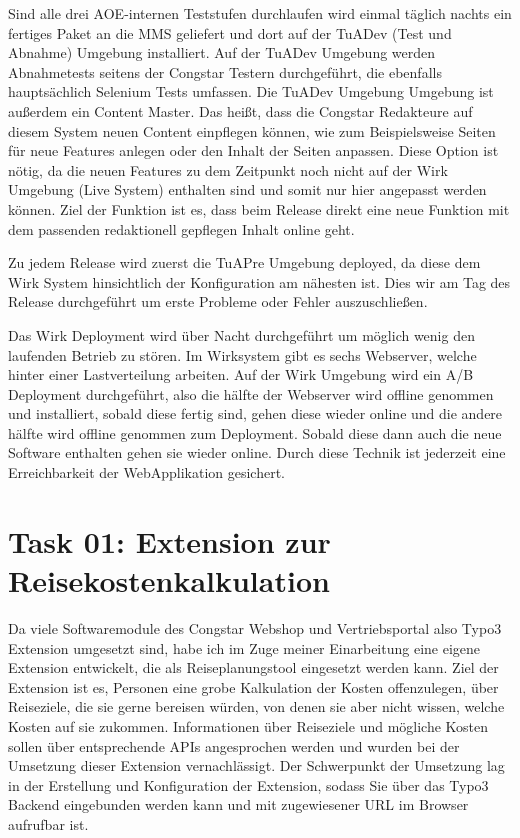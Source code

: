 \documentclass[11pt,a4paper]{article} %
\begin{document}
Sind alle drei AOE-internen Teststufen durchlaufen wird einmal täglich nachts ein fertiges Paket an die MMS geliefert und dort auf der TuADev (Test und Abnahme) Umgebung installiert. Auf der TuADev Umgebung werden Abnahmetests seitens der Congstar Testern durchgeführt, die ebenfalls hauptsächlich Selenium Tests umfassen. Die TuADev Umgebung Umgebung ist außerdem ein Content Master. Das heißt, dass die Congstar Redakteure auf diesem System neuen Content einpflegen können, wie zum Beispielsweise Seiten für neue Features anlegen oder den Inhalt der Seiten anpassen. Diese Option ist nötig, da die neuen Features zu dem Zeitpunkt noch nicht auf der Wirk Umgebung (Live System) enthalten sind und somit nur hier angepasst werden können. Ziel der Funktion ist es, dass beim Release direkt eine neue Funktion mit dem passenden redaktionell gepflegen Inhalt online geht.

Zu jedem Release wird zuerst die TuAPre Umgebung deployed, da diese dem Wirk System hinsichtlich der Konfiguration am nähesten ist.
Dies wir am Tag des Release durchgeführt um erste Probleme oder Fehler auszuschließen.

Das Wirk Deployment wird über Nacht durchgeführt um möglich wenig den laufenden Betrieb zu stören. Im Wirksystem gibt es sechs Webserver, welche hinter einer Lastverteilung arbeiten. Auf der Wirk Umgebung wird ein A/B Deployment durchgeführt, also die hälfte der Webserver wird offline genommen und installiert, sobald diese fertig sind, gehen diese wieder online und die andere hälfte wird offline genommen zum Deployment. Sobald diese dann auch die neue Software enthalten gehen sie wieder online.
Durch diese Technik ist jederzeit eine Erreichbarkeit der WebApplikation gesichert.




\section{Task 01: Extension zur Reisekostenkalkulation} \label{sec:pipeline}

Da viele Softwaremodule des Congstar Webshop und Vertriebsportal also Typo3 Extension umgesetzt sind, habe ich im Zuge 
meiner Einarbeitung eine eigene Extension entwickelt, die als Reiseplanungstool eingesetzt werden kann.
Ziel der Extension ist es, Personen eine grobe Kalkulation der Kosten offenzulegen, über Reiseziele, 
die sie gerne bereisen würden, von denen sie aber nicht wissen, welche Kosten auf sie zukommen. 
Informationen über Reiseziele und mögliche Kosten sollen über entsprechende APIs angesprochen werden und wurden bei der Umsetzung dieser Extension vernachlässigt.
Der Schwerpunkt der Umsetzung lag in der Erstellung und Konfiguration der Extension, sodass Sie über das
Typo3 Backend eingebunden werden kann und mit zugewiesener URL im Browser aufrufbar ist.
\end{document}
